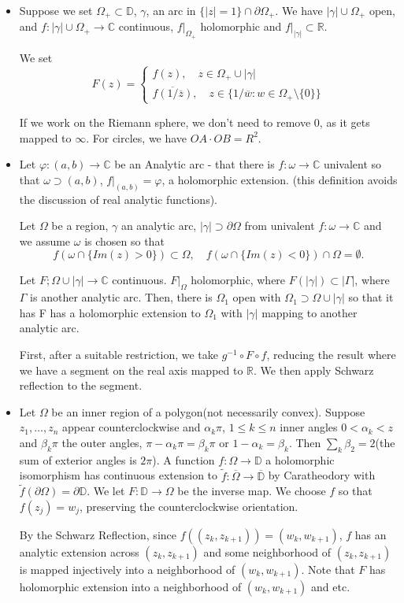 \documentclass[12pt]{scrartcl}
\newcommand{\R}{\mathbb{R}}
\newcommand{\C}{\mathbb C}
\newcommand{\D}{\mathbb D}
\renewcommand{\tilde}{\widetilde}
\let \phi \varphi
\let \ol \overline
\begin{document}
\begin{itemize}
\item Suppose we set $\Omega_+ \subset \mathbb D$, $\gamma$, an arc in $\{|z| = 1\} \cap \partial \Omega_+$.  We have $|\gamma| \cup \Omega_+$ open, and $f: |\gamma| \cup \Omega_+ \to \C$ continuous, $f\vert_{\Omega_+}$ holomorphic and $f \vert_{|\gamma|} \subset \R$.  

We set 
$$F(z) = \begin{cases}
f(z), \quad z \in \Omega_+ \cup |\gamma|  \\
\ol{f(1/\ol{z})}, \quad z \in \{  1/\ol{w}: w \in \Omega_+ \setminus \{0\}  \}
\end{cases}$$

If we work on the Riemann sphere, we don't need to remove $0$, as it gets mapped to $\infty$.  For circles, we have $OA \cdot OB = R^2$.


\item  Let $\phi: (a, b) \to \C$ be an Analytic arc - that there is $f: \omega \to \C$ univalent so that $\omega \supset (a, b)$, $f \vert_{(a, b)} = \phi$, a holomorphic extension.  (this definition avoids the discussion of real analytic functions).

Let $\Omega$ be a region, $\gamma$ an analytic arc, $|\gamma| \supset \partial \Omega$ from univalent $f: \omega \to\C$ and we assume $\omega$ is chosen so that 
$$f(\omega \cap \{Im(z) > 0\}) \subset \Omega, \quad f(\omega \cap \{Im(z) < 0\}) \cap \Omega = \emptyset.$$

Let $F; \Omega \cup |\gamma| \to \C$ continuous. $F \vert_\Omega$ holomorphic, where $F(|\gamma|) \subset |\Gamma|$, where $\Gamma$ is another analytic arc.  Then, there is $\Omega_1$ open with $\Omega_1 \supset \Omega \cup |\gamma|$ so that it has F has a holomorphic extension to $\Omega_1$ with $|\gamma|$ mapping to another analytic arc.

First, after a suitable restriction, we take $g^{-1} \circ F \circ f$, reducing the result where we have a segment on the real axis mapped to $\R$.  We then apply Schwarz reflection to the segment.  

\item Let $\Omega$ be an inner region of a polygon(not necessarily convex).  Suppose $z_1, \dots, z_n$ appear counterclockwise and $\alpha_k \pi$, $1 \le k \le n$ inner angles $0 < \alpha_k < z$ and $\beta_k \pi$ the outer angles, $\pi - \alpha_k \pi = \beta_k \pi$ or $1 - \alpha_k = \beta_k$.  Then $\sum_k \beta_2 = 2$(the sum of exterior angles is $2\pi$).  A function $f: \Omega \to \D$ a holomorphic isomorphism has continuous extension to $\tilde{f}: \ol{\Omega} \to \ol{\mathbb D}$ by Caratheodory with $\tilde{f}(\partial \Omega) = \partial \mathbb D$.  We let $F: \mathbb D \to \Omega$ be the inverse map.  We choose $f$ so that $f(z_j) = w_j$, preserving the counterclockwise orientation.  

By the Schwarz Reflection, since $f((z_k, z_{k+1})) = (w_k, w_{k+1})$,  $f$ has an analytic extension across $(z_k, z_{k+1})$ and some neighborhood of $(z_k, z_{k+1})$ is mapped injectively into a neighborhood of $(w_k, w_{k+1})$.  Note that $F$ has holomorphic extension into a neighborhood of $(w_k, w_{k+1})$ and etc.
\end{itemize}
\end{document}
